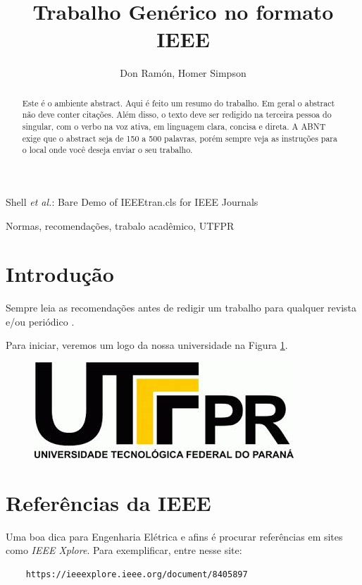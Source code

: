 \documentclass[journal]{IEEEtran}
\begin{document}
\title{Trabalho Genérico no formato IEEE}

\author{Don Ramón, Homer Simpson}

{Shell \MakeLowercase{\textit{et al.}}: Bare Demo of IEEEtran.cls for IEEE Journals}
\maketitle

\begin{abstract}
Este é o ambiente abstract. Aqui é feito um resumo do trabalho. Em geral o abstract não deve conter citações. Além disso, o texto deve ser redigido na terceira pessoa do singular, com o verbo na voz ativa, em linguagem clara, concisa e direta. A ABNT exige que o abstract seja de 150 a 500 palavras, porém sempre veja as instruções para o local onde você deseja enviar o seu trabalho. 
\end{abstract}

\begin{IEEEkeywords}
Normas, recomendações, trabalo acadêmico, UTFPR
\end{IEEEkeywords}


\section{Introdução}

Sempre leia as recomendações antes de redigir um trabalho para qualquer revista e/ou periódico \cite{pastro2019}. 

Para iniciar, veremos um logo da nossa universidade na Figura \ref{fig.UTFPR}.
\begin{figure}[h!]
	\centering
	\label{fig.UTFPR}
	\includegraphics[width=.7\linewidth]{figs/UTFPR.png}
\end{figure}

\section{Referências da IEEE}
Uma boa dica para Engenharia Elétrica e afins é procurar referências em sites como \textit{IEEE Xplore}. Para exemplificar, entre nesse site:
\begin{verbatim}
	https://ieeexplore.ieee.org/document/8405897
\end{verbatim}
\end{document}
